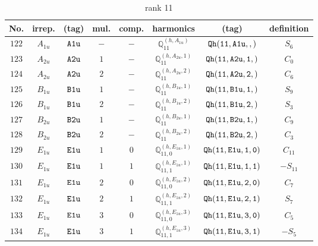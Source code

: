 \documentclass[fleqn,8pt]{jsarticle}
\begin{document}
\begin{table}[ht!]
\begin{center}
\caption{rank 11}
\renewcommand{\arraystretch}{1.3}
\begin{tabular}{cccccccc} \hline \hline
No. & irrep. & (tag) & mul. & comp. & harmonics & (tag) & definition \\ \hline
$ 122 $ & $ A_{1u} $ & $ {\tt A1u} $ & $ - $ & $ - $ & $ \mathbb{Q}_{11}^{(h,A_{1u})} $ & $ {\tt Qh(11,A1u,,)} $ & $ S_{6} $ \\
$ 123 $ & $ A_{2u} $ & $ {\tt A2u} $ & $ 1 $ & $ - $ & $ \mathbb{Q}_{11}^{(h,A_{2u},1)} $ & $ {\tt Qh(11,A2u,1,)} $ & $ C_{0} $ \\
$ 124 $ & $ A_{2u} $ & $ {\tt A2u} $ & $ 2 $ & $ - $ & $ \mathbb{Q}_{11}^{(h,A_{2u},2)} $ & $ {\tt Qh(11,A2u,2,)} $ & $ C_{6} $ \\
$ 125 $ & $ B_{1u} $ & $ {\tt B1u} $ & $ 1 $ & $ - $ & $ \mathbb{Q}_{11}^{(h,B_{1u},1)} $ & $ {\tt Qh(11,B1u,1,)} $ & $ S_{9} $ \\
$ 126 $ & $ B_{1u} $ & $ {\tt B1u} $ & $ 2 $ & $ - $ & $ \mathbb{Q}_{11}^{(h,B_{1u},2)} $ & $ {\tt Qh(11,B1u,2,)} $ & $ S_{3} $ \\
$ 127 $ & $ B_{2u} $ & $ {\tt B2u} $ & $ 1 $ & $ - $ & $ \mathbb{Q}_{11}^{(h,B_{2u},1)} $ & $ {\tt Qh(11,B2u,1,)} $ & $ C_{9} $ \\
$ 128 $ & $ B_{2u} $ & $ {\tt B2u} $ & $ 2 $ & $ - $ & $ \mathbb{Q}_{11}^{(h,B_{2u},2)} $ & $ {\tt Qh(11,B2u,2,)} $ & $ C_{3} $ \\
$ 129 $ & $ E_{1u} $ & $ {\tt E1u} $ & $ 1 $ & $ 0 $ & $ \mathbb{Q}_{11,0}^{(h,E_{1u},1)} $ & $ {\tt Qh(11,E1u,1,0)} $ & $ C_{11} $ \\
$ 130 $ & $ E_{1u} $ & $ {\tt E1u} $ & $ 1 $ & $ 1 $ & $ \mathbb{Q}_{11,1}^{(h,E_{1u},1)} $ & $ {\tt Qh(11,E1u,1,1)} $ & $ - S_{11} $ \\
$ 131 $ & $ E_{1u} $ & $ {\tt E1u} $ & $ 2 $ & $ 0 $ & $ \mathbb{Q}_{11,0}^{(h,E_{1u},2)} $ & $ {\tt Qh(11,E1u,2,0)} $ & $ C_{7} $ \\
$ 132 $ & $ E_{1u} $ & $ {\tt E1u} $ & $ 2 $ & $ 1 $ & $ \mathbb{Q}_{11,1}^{(h,E_{1u},2)} $ & $ {\tt Qh(11,E1u,2,1)} $ & $ S_{7} $ \\
$ 133 $ & $ E_{1u} $ & $ {\tt E1u} $ & $ 3 $ & $ 0 $ & $ \mathbb{Q}_{11,0}^{(h,E_{1u},3)} $ & $ {\tt Qh(11,E1u,3,0)} $ & $ C_{5} $ \\
$ 134 $ & $ E_{1u} $ & $ {\tt E1u} $ & $ 3 $ & $ 1 $ & $ \mathbb{Q}_{11,1}^{(h,E_{1u},3)} $ & $ {\tt Qh(11,E1u,3,1)} $ & $ - S_{5} $ \\

\end{tabular}
\end{center}
\end{table}
\end{document}
